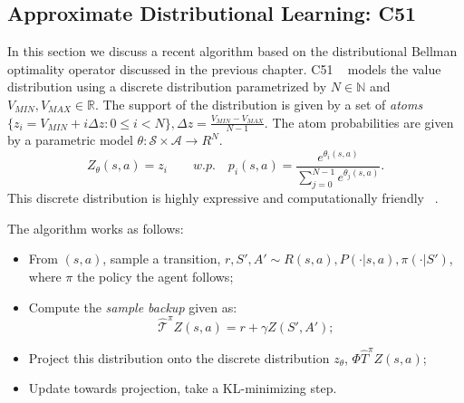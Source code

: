 \subsection{Approximate Distributional Learning: C51}
In this section we discuss a recent algorithm based on the distributional Bellman optimality operator discussed in the previous chapter. C51 ~\cite{DBLP:journals/corr/BellemareDM17} models the value distribution using a discrete distribution parametrized by $N \in \mathbb{N}$ and $V_{MIN}, V_{MAX} \in \mathbb{R}$. The support of the distribution is given by a set of \emph{atoms} $\lbrace z_i= V_{MIN} + i\Delta z : 0 \leq i < N \rbrace, \Delta z= \frac{V_{MIN}-V_{MAX}}{N-1}$. The atom probabilities are given by a parametric model $\theta: \mathcal{S} \times \mathcal{A} \rightarrow R^N$. 
\begin{equation}
Z_{\theta}(s,a) =z_i \qquad w.p. 	\quad p_i(s,a)= \frac{e^{\theta_i(s,a)}}{\sum_{j=0}^{N-1}e^{\theta_j(s,a)}}.
\end{equation}
This discrete distribution is highly expressive and computationally friendly ~\cite{VanDenOord:2016:PRN:3045390.3045575}.\par
The algorithm works as follows:
\begin{itemize}
	\item From $(s,a)$, sample a transition, $r, S', A' \sim R(s,a), P(\cdot|s,a), \pi(\cdot|S')$, where $\pi$ the policy the agent follows;
	\item Compute the \emph{sample backup} given as:
	\begin{equation}
	\hat{\mathcal{T}}^\pi Z(s,a)=r+\gamma Z(S',A');
	\end{equation}
	\item Project this distribution onto the discrete distribution $z_\theta$, $\Phi \widehat{T}^\pi Z(s,a)$;
	\item Update towards projection, \ie take a KL-minimizing step.
\end{itemize}
